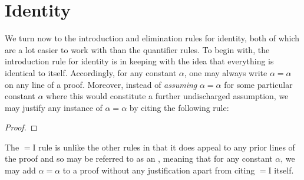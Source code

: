 \section{Identity}

We turn now to the introduction and elimination rules for identity, both of which are a lot easier to work with than the quantifier rules.
To begin with, the introduction rule for identity is in keeping with the idea that everything is identical to itself.
Accordingly, for any constant $\alpha$, one may always write $\alpha = \alpha$ on any line of a proof.
Moreover, instead of \textit{assuming} $\alpha = \alpha$ for some particular constant $\alpha$ where this would constitute a further undischarged assumption, we may justify any instance of $\alpha = \alpha$ by citing the following rule: 

\begin{proof}
   
\end{proof}

The $=$I rule is unlike the other rules in that it does appeal to any prior lines of the proof and so may be referred to as an , meaning that for any constant $\alpha$, we may add $\alpha=\alpha$ to a proof without any justification apart from citing $=$I itself. 

